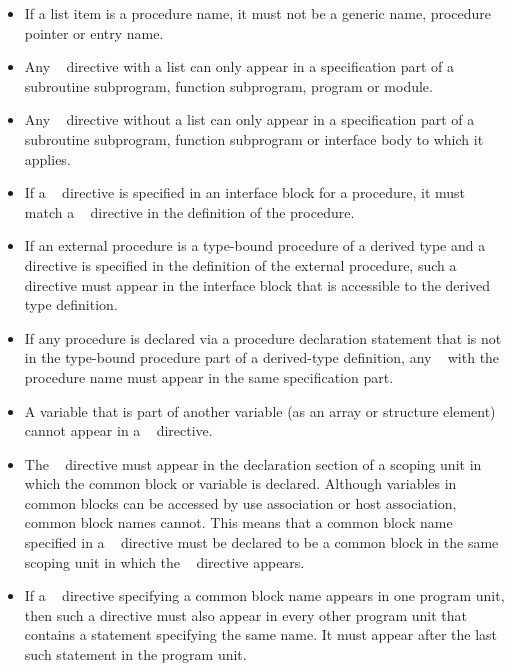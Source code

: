 \fortranspecificstart
\begin{itemize}
\item If a list item is a procedure name, it must not be a generic name, procedure pointer or 
entry name.

\item Any ~ directive with a list can only appear in a specification part 
of a subroutine subprogram, function subprogram, program or module.

\item Any ~ directive without a list can only appear in a specification 
part of a subroutine subprogram, function subprogram or interface body to which it 
applies.

\item If a ~ directive is specified in an interface block for a procedure, it 
must match a ~ directive in the definition of the procedure.
\item If an external procedure is a type-bound procedure of a derived type and a ~ directive is specified in the definition of the external procedure, such a directive must appear in the interface block that is accessible to the derived type definition.
\item If any procedure is declared via a procedure declaration statement that is not in the type-bound procedure part of a derived-type definition, any ~ with the procedure name must appear in the same specification part.

\item A variable that is part of another variable (as an array or structure element) cannot 
appear in a ~ directive.

\item The ~ directive must appear in the declaration section of a scoping 
unit in which the common block or variable is declared. Although variables in 
common blocks can be accessed by use association or host association, common 
block names cannot. This means that a common block name specified in a 
~ directive must be declared to be a common block in the same scoping unit 
in which the ~ directive appears.

\item If a ~ directive specifying a common block name appears in one 
program unit, then such a directive must also appear in every other program unit that 
contains a  statement specifying the same name. It must appear after the last 
such  statement in the program unit.


\end{itemize}
